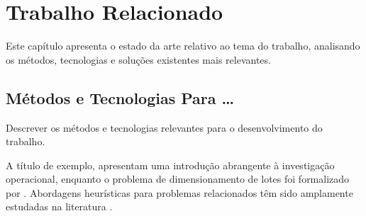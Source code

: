 %


\chapter{Trabalho Relacionado}
\label{cap:trabalho_relacionado}

Este capítulo apresenta o estado da arte relativo ao tema do trabalho, analisando os métodos, tecnologias e soluções existentes mais relevantes.

\section{Métodos e Tecnologias Para \ldots}
\label{sec:metodos_tecnologias}

Descrever os métodos e tecnologias relevantes para o desenvolvimento do trabalho.

A título de exemplo, \citet{hillier2001} apresentam uma introdução abrangente à investigação operacional, enquanto o problema de dimensionamento de lotes foi formalizado por \citet{fleischmann1990}. Abordagens heurísticas para problemas relacionados têm sido amplamente estudadas na literatura \citep{pattloch2001, wiendhal1995}.

